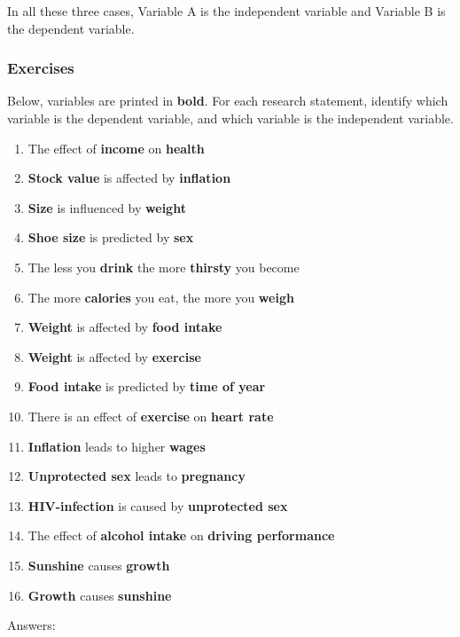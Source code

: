 In all these three cases, Variable A is the independent variable and Variable B is the dependent variable.

\subsubsection{Exercises}

Below, variables are printed in \textbf{bold}. For each research statement, identify which variable is the dependent variable, and which variable is the independent variable.

\begin{enumerate}

\item The effect of \textbf{income} on \textbf{health}
\item \textbf{Stock value} is affected by \textbf{inflation}
\item \textbf{Size} is influenced by \textbf{weight}
\item \textbf{Shoe size} is predicted by \textbf{sex}
\item The less you \textbf{drink} the more \textbf{thirsty} you become 
\item The more \textbf{calories} you eat, the more you \textbf{weigh}
\item \textbf{Weight} is affected by \textbf{food intake} 
\item \textbf{Weight} is affected by \textbf{exercise} 
\item \textbf{Food intake} is predicted by \textbf{time of year}
\item There is an effect of \textbf{exercise} on \textbf{heart rate} 
\item \textbf{Inflation} leads to higher \textbf{wages} 
\item \textbf{Unprotected sex} leads to \textbf{pregnancy}
\item \textbf{HIV-infection} is caused by \textbf{unprotected sex}
\item The effect of \textbf{alcohol intake} on \textbf{driving performance}
\item \textbf{Sunshine} causes \textbf{growth}
\item \textbf{Growth} causes \textbf{sunshine}

\end{enumerate}

Answers:

